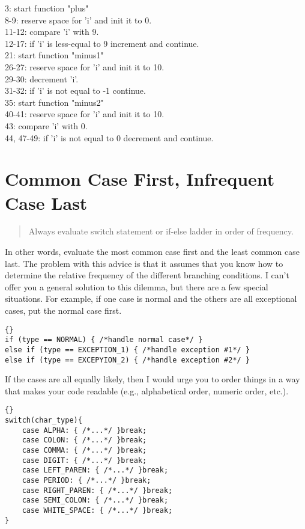 \documentclass{report}
\begin{document}
\begin{minipage}[t]{9cm}



\small
3: start function "plus"\\
8-9: reserve space for 'i' and init it to 0.\\
11-12: compare 'i' with 9.\\
12-17: if 'i' is less-equal to 9 increment and continue.\\

21: start function "minus1"\\ 
26-27: reserve space for 'i' and init it to 10.\\
29-30: decrement 'i'.\\
31-32: if 'i' is not equal to -1 continue.\\

35: start function "minus2"\\ 
40-41: reserve space for 'i' and init it to 10.\\
43: compare 'i' with 0.\\
44, 47-49: if 'i' is not equal to 0 decrement and continue.\\

\end{minipage}
\begin{minipage}[t]{7cm}

\end{minipage}


\section{Common Case First, Infrequent Case Last}
\begin{quote}
Always evaluate switch statement or if-else ladder in order of frequency.
\end{quote}
In other words, evaluate the most common case first and the least common case last. The problem with this advice is that it assumes that you know how to determine the relative frequency of the different branching conditions. I can't offer you a general solution to this dilemma, but there are a few special situations. For example, if one case is normal and the others are all exceptional cases, put the normal case first.
\begin{lstlisting}{}
if (type == NORMAL) { /*handle normal case*/ }
else if (type == EXCEPTION_1) { /*handle exception #1*/ }
else if (type == EXCEPYION_2) { /*handle exception #2*/ }
\end{lstlisting}
If the cases are all equally likely, then I would urge you to order things in a way that makes your code readable (e.g., alphabetical order, numeric order, etc.).
\begin{lstlisting}{}
switch(char_type){
    case ALPHA: { /*...*/ }break;
    case COLON: { /*...*/ }break;
    case COMMA: { /*...*/ }break;
    case DIGIT: { /*...*/ }break;
    case LEFT_PAREN: { /*...*/ }break;
    case PERIOD: { /*...*/ }break;
    case RIGHT_PAREN: { /*...*/ }break;
    case SEMI_COLON: { /*...*/ }break;
    case WHITE_SPACE: { /*...*/ }break;
}
\end{lstlisting}
\end{document}
